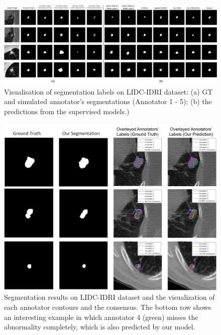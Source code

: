 \begin{figure}[t!]
    \vspace{-3mm}
    \centering
    \includegraphics[width=\linewidth]{chapter_8_neurips/picture17.jpg}
    \caption{\footnotesize Visualisation of segmentation labels on LIDC-IDRI dataset: (a) GT and simulated annotator's segmentations (Annotator 1 - 5); (b) the predictions from the supervised models.)} 
    \label{LIDC segmentation}
\end{figure}


\begin{figure}[t!]
        \centering
        \includegraphics[width=0.9\linewidth]{chapter_8_neurips/picture10.jpg}
        \caption{\footnotesize Segmentation results on LIDC-IDRI dataset and the visualization of each annotator contours and the consensus. The bottom row shows an interesting example in which annotator 4 (green) misses the abnormality completely, which is also predicted by our model.}
        \label{LIDCresults}
\end{figure}



